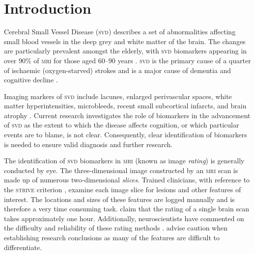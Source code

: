 %
%

\chapter{Introduction}\label{s-intro}

{\noindent} Cerebral Small Vessel Disease (\textsc{svd}) describes a set of abnormalities affecting small blood vessels in the deep grey and white matter of the brain. The changes are particularly prevalent amongst the elderly, with \textsc{svd} biomarkers appearing in over 90\% of \textsc{mri} for those aged 60--90 years \citep{deLeeuwF-E2001Pocw}. \textsc{svd} is the primary cause of a quarter of ischaemic (oxygen-starved) strokes \citep{WardlawJ.M.2013Nsfr} and is a major cause of dementia and cognitive decline \citep{NorrvingBo2008Linb}.

Imaging markers of \textsc{svd} include lacunes, enlarged perivascular spaces, white matter hyperintensities, microbleeds, recent small subcortical infarcts, and brain atrophy \citep{WardlawJ.M.2013Nsfr}. Current research investigates the role of  biomarkers in the advancement of \textsc{svd} as the extent to which the disease affects cognition, or which particular events are to blame, is not clear. Consequently, clear identification of biomarkers is needed to ensure valid diagnosis and further research.

The identification of \textsc{svd} biomarkers in \textsc{mri} (known as image \textit{rating}) is generally conducted by eye. The three-dimensional image constructed by an \textsc{mri} scan is made up of numerous two-dimensional \textit{slices}. Trained clinicians, with reference to the \textsc{strive} criterion \citep{WardlawJ.M.2013Nsfr}, examine each image slice for lesions and other features of interest. The locations and sizes of these features are logged manually and is therefore a very time consuming task. \cite{Heuvel2016} claim that the rating of a single brain scan takes approximately one hour. Additionally, neuroscientists have commented on the difficulty and reliability of these rating methods \citep{BenjaminJ.Philip2018LIbN, GhafoorianM.2017Dml3, Yokoyama2007}. \cite{WardlawJm2013Mosc} advise caution when establishing research conclusions as many of the features are difficult to differentiate. 

%

